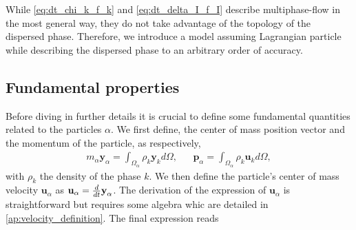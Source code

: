 
\label{sec:dispersed-two-fluid}
While \ref{eq:dt_chi_k_f_k} and \ref{eq:dt_delta_I_f_I} describe multiphase-flow in the most general way, they do not take advantage of the topology of the dispersed phase. 
Therefore, we introduce a model assuming Lagrangian particle while describing the dispersed phase to an arbitrary order of accuracy. 

\subsection{Fundamental properties}
Before diving in further details it is crucial to define some fundamental quantities related to the particles $\alpha$.
We first define, the center of mass position vector and the momentum of the particle, as respectively,
\begin{align}
    m_\alpha \textbf{y}_\alpha
    = \int_{\Omega_\alpha} \rho_k \textbf{y}_k d\Omega,
    &&
    \textbf{p}_\alpha 
    = \int_{\Omega_\alpha} \rho_k \textbf{u}_k d\Omega,
    \label{eq:position_and_momentum_def}
\end{align}
with $\rho_k$ the density of the phase $k$. 
We then define the particle's center of mass velocity $\textbf{u}_\alpha$ as $\textbf{u}_\alpha = \frac{d}{d t} \textbf{y}_\alpha$. The derivation of the expression of $\textbf{u}_\alpha$ is straightforward but requires some algebra whic are detailed in \ref{ap:velocity_definition}. The final expression reads%


